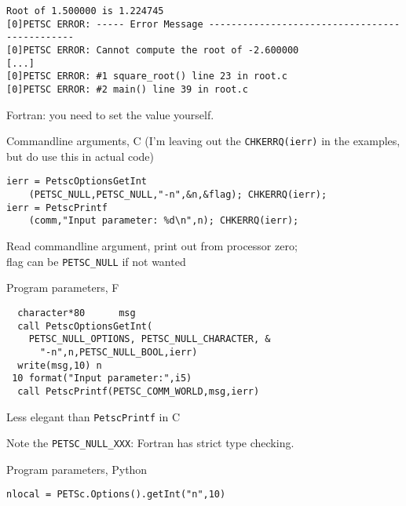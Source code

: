 \begin{details}
\begin{exerciseframe}[root]
\begingroup \tiny
\begin{verbatim}
Root of 1.500000 is 1.224745
[0]PETSC ERROR: ----- Error Message ----------------------------------------------
[0]PETSC ERROR: Cannot compute the root of -2.600000
[...]
[0]PETSC ERROR: #1 square_root() line 23 in root.c
[0]PETSC ERROR: #2 main() line 39 in root.c
\end{verbatim}
\endgroup
Fortran: you need to set the  value yourself.
\end{exerciseframe}

\begin{numberedframe}{Commandline arguments, C}
(I'm leaving out the \lstinline{CHKERRQ(ierr)} in the examples,\\
but do use this in actual code)
\begin{lstlisting}
ierr = PetscOptionsGetInt
    (PETSC_NULL,PETSC_NULL,"-n",&n,&flag); CHKERRQ(ierr);
ierr = PetscPrintf
    (comm,"Input parameter: %d\n",n); CHKERRQ(ierr);
\end{lstlisting}
Read commandline argument, print out from processor zero;\\
flag can be \lstinline{PETSC_NULL} if not wanted
\end{numberedframe}

\lstset{language=Fortran}
\begin{numberedframe}{Program parameters, F}
\begin{lstlisting}
  character*80      msg
  call PetscOptionsGetInt(
    PETSC_NULL_OPTIONS, PETSC_NULL_CHARACTER, &
      "-n",n,PETSC_NULL_BOOL,ierr)
  write(msg,10) n
 10 format("Input parameter:",i5)
  call PetscPrintf(PETSC_COMM_WORLD,msg,ierr)
\end{lstlisting}
Less elegant than \lstinline{PetscPrintf} in C

Note the \lstinline{PETSC_NULL_XXX}: Fortran has strict type checking.
\end{numberedframe}

\lstset{language=C}

\end{details}

\lstset{language=Python}
\begin{numberedframe}{Program parameters, Python}
\begin{lstlisting}
nlocal = PETSc.Options().getInt("n",10)
\end{lstlisting}
\end{numberedframe}
\lstset{language=C}

\endinput

\begin{numberedframe}{, C}
\begin{verbatim}
\end{verbatim}
\end{numberedframe}

\begin{numberedframe}{, F}
\begin{verbatim}
\end{verbatim}
\end{numberedframe}

